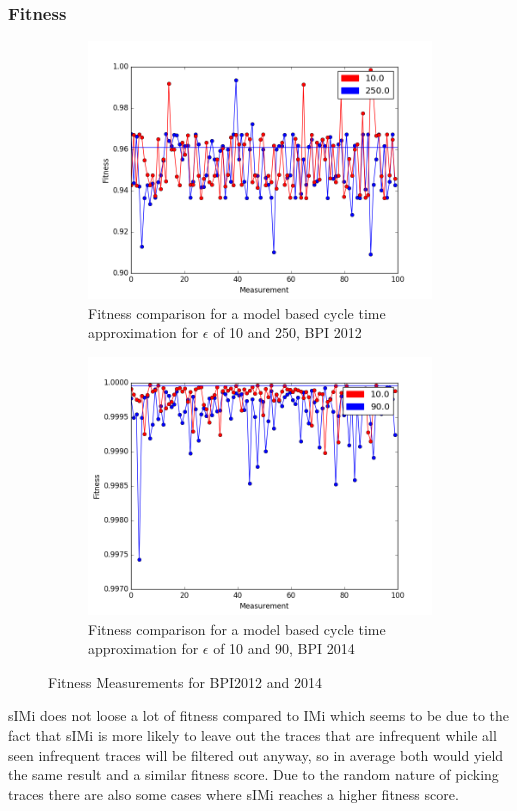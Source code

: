 \documentclass[
	a4paper,
	pagesize,
	pdftex,
	12pt,
	twoside, %
	BCOR=5mm, %
	ngerman,
	fleqn,
	final,
	]{scrartcl}
\begin{document}
\subsubsection{Fitness}
\begin{figure}[h]
	\begin{subfigure}{.49\textwidth}
	  \centering
	  \includegraphics[width=.8\linewidth]{data/BPI2012/lax_10_250_fitness.png}
	  \caption{Fitness comparison for a model based cycle time approximation for $\epsilon$ of 10 and 250, BPI 2012}
	\end{subfigure}%
	\begin{subfigure}{.49\textwidth}
	  \centering
	  \includegraphics[width=.8\linewidth]{data/BPI2014/lax_10_90_fitness.png}
	  \caption{Fitness comparison for a model based cycle time approximation for $\epsilon$ of 10 and 90, BPI 2014}
	  \label{fig:fitnessStrict12}
	\end{subfigure}
	\caption{Fitness Measurements for BPI2012 and 2014}
	\label{fig:fitness1214}
\end{figure}
sIMi does not loose a lot of fitness compared to IMi which seems to be due to the fact that sIMi is more likely to leave out the traces that are infrequent while all seen infrequent traces will be filtered out anyway, so in average both would yield the same result and a similar fitness score. Due to the random nature of picking traces there are also some cases where sIMi reaches a higher fitness score.\\
\end{document}
